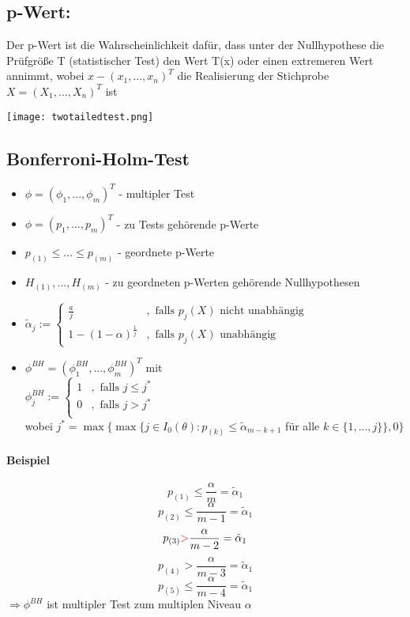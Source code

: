 \subsection{p-Wert:}
Der p-Wert ist die Wahrscheinlichkeit dafür, dass unter der Nullhypothese die Prüfgröße T (statistischer Test) den Wert T(x) oder einen extremeren Wert annimmt, wobei $x-(x_1,...,x_n)^T$ die Realisierung der Stichprobe $X=(X_1,...,X_n)^T$ ist
\begin{center}
\texttt{[image: twotailedtest.png]}
\end{center}

\subsection{Bonferroni-Holm-Test}
\begin{itemize}
 \item $\phi=(\phi_1,...,\phi_m)^T $ - multipler Test
 \item $\phi=(p_1,...,p_m)^T $ - zu Tests gehörende p-Werte
 \item $p_{(1)} \leq ... \leq p_{(m)} $ - geordnete p-Werte
 \item $H_{(1)},...,H_{(m)} $ - zu geordneten p-Werten gehörende Nullhypothesen
 \item $\tilde{\alpha}_j := 
	\begin{cases}
	 \frac{a}{j} & , \text{ falls } p_j(X) \text{ nicht unabhängig } \\
	 1-(1-\alpha)^{\frac{1}{j}} & , \text{ falls } p_j(X) \text{ unabhängig }
	\end{cases}
	$
 \item $\phi^{BH}=(\phi_1^{BH},...,\phi_m^{BH})^T$ mit \\
 $\phi_j^{BH} := 
      \begin{cases}
       1 & ,\text{ falls } j \leq j^* \\
       0 & ,\text{ falls } j > j^* \\
      \end{cases}
      $\\
      wobei $j^* =\max\{ \max\{j \in I_0(\theta) : p_{(k)} \leq \tilde{\alpha}_{m-k+1}$ für alle $k \in \{1,...,j\}\}, 0 \}$
\end{itemize}
\paragraph{Beispiel}
\[ p_{(1)} \leq \frac{\alpha}{m} = \tilde{\alpha}_1 \]
\[ p_{(2)} \leq \frac{\alpha}{m-1} = \tilde{\alpha}_1 \]
\[ p_{(3)} \textcolor{red}{>} \frac{\alpha}{m-2} = \tilde{\alpha}_1 \]
\[ p_{(4)} > \frac{\alpha}{m-3} = \tilde{\alpha}_1 \]
\[ p_{(5)} \leq \frac{\alpha}{m-4} = \tilde{\alpha}_1 \]
$\Rightarrow \phi^{BH}$ ist multipler Test zum multiplen Niveau $\alpha$ 
